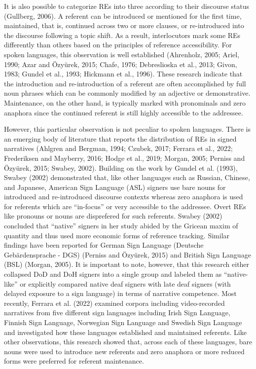 \documentclass[]{elsarticle} %
\begin{document}
It is also possible to categorize REs into three according to their
discourse status (Gullberg, 2006). A referent can be introduced or
mentioned for the first time, maintained, that is, continued across two
or more clauses, or re-introduced into the discourse following a topic
shift. As a result, interlocutors mark some REs differently than others
based on the principles of reference accessibility. For spoken
languages, this observation is well established (Ahrenholz, 2005; Ariel,
1990; Azar and Özyürek, 2015; Chafe, 1976; Debreslioska et al., 2013;
Givon, 1983; Gundel et al., 1993; Hickmann et al., 1996). These research
indicate that the introduction and re-introduction of a referent are
often accomplished by full noun phrases which can be commonly modified
by an adjective or demonstrative. Maintenance, on the other hand, is
typically marked with pronominals and zero anaphora since the continued
referent is still highly accessible to the addressee.

However, this particular observation is not peculiar to spoken
languages. There is an emerging body of literature that reports the
distribution of REs in signed narratives (Ahlgren and Bergman, 1994;
Czubek, 2017; Ferrara et al., 2022; Frederiksen and Mayberry, 2016;
Hodge et al., 2019; Morgan, 2005; Perniss and Özyürek, 2015; Swabey,
2002). Building on the work by Gundel et al. (1993), Swabey (2002)
demonstrated that, like other languages such as Russian, Chinese, and
Japanese, American Sign Language (ASL) signers use bare nouns for
introduced and re-introduced discourse contexts whereas zero anaphora is
used for referents which are ``in-focus'' or very accessible to the
addressee. Overt REs like pronouns or nouns are disprefered for such
referents. Swabey (2002) concluded that ``native'' signers in her study
abided by the Gricean maxim of quantity and thus used more economic
forms of reference tracking. Similar findings have been reported for
German Sign Language (Deutsche Gebärdensprache - DGS) (Perniss and
Özyürek, 2015) and British Sign Language (BSL) (Morgan, 2005). It is
important to note, however, that this research either collapsed DoD and
DoH signers into a single group and labeled them as ``native-like'' or
explicitly compared native deaf signers with late deaf signers (with
delayed exposure to a sign language) in terms of narrative competence.
Most recently, Ferrara et al. (2022) examined corpora including
video-recorded narratives from five different sign languages including
Irish Sign Language, Finnish Sign Language, Norwegian Sign Language and
Swedish Sign Language and investigated how these languages established
and maintained referents. Like other observations, this research showed
that, across each of these languages, bare nouns were used to introduce
new referents and zero anaphora or more reduced forms were preferred for
referent maintenance.
\end{document}
